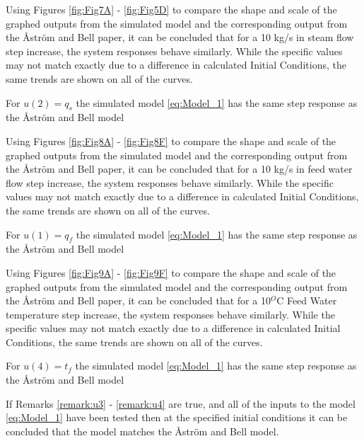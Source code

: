         Using Figures \ref{fig:Fig7A} - \ref{fig:Fig5D} to compare the shape and scale of the graphed outputs from the simulated model and the corresponding output from the \r{A}str\"{o}m and Bell paper, it can be concluded that for a 10 kg/s in steam flow step increase, the system responses behave similarly. While the specific values may not match exactly due to a difference in calculated Initial Conditions, the same trends are shown on all of the curves. 
        \begin{rem}
            For $u(2) = q_s$ the simulated model \eqref{eq:Model_1} has the same step response as the \r{A}str\"{o}m and Bell model
            \label{remark:u2}
        \end{rem}
        
        Using Figures \ref{fig:Fig8A} - \ref{fig:Fig8F} to compare the shape and scale of the graphed outputs from the simulated model and the corresponding output from the \r{A}str\"{o}m and Bell paper, it can be concluded that for a  10 kg/s in feed water flow step increase, the system responses behave similarly. While the specific values may not match exactly due to a difference in calculated Initial Conditions, the same trends are shown on all of the curves. 
        \begin{rem}
            For $u(1) = q_f$ the simulated model \eqref{eq:Model_1} has the same step response as the \r{A}str\"{o}m and Bell model
            \label{remark:u1}
        \end{rem}
        
        Using Figures \ref{fig:Fig9A} - \ref{fig:Fig9F} to compare the shape and scale of the graphed outputs from the simulated model and the corresponding output from the \r{A}str\"{o}m and Bell paper, it can be concluded that for a 10$^O$C Feed Water temperature step  increase, the system responses behave similarly. While the specific values may not match exactly due to a difference in calculated Initial Conditions, the same trends are shown on all of the curves. 
        \begin{rem}
            For $u(4) = t_f$ the simulated model \eqref{eq:Model_1} has the same step response as the \r{A}str\"{o}m and Bell model
            \label{remark:u4}
        \end{rem}
        
        If Remarks \ref{remark:u3} - \ref{remark:u4} are true, and all of the inputs to the model \eqref{eq:Model_1} have been tested then at the specified initial conditions it can be concluded that the model matches the \r{A}str\"{o}m and Bell model.
        
